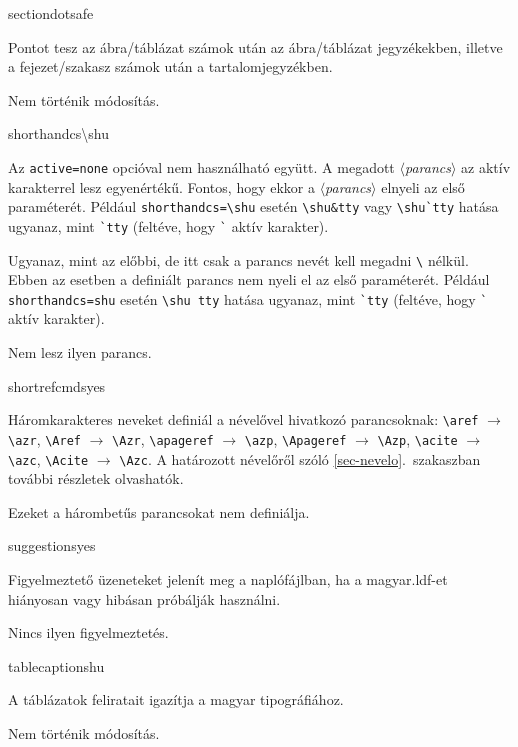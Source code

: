 \documentclass[12pt]{article}
\newcommand\param[1]{{\normalfont\slshape$\langle$#1$\rangle$}}
\begin{document}
\begin{description}
\begin{hunopt}{sectiondot}{safe}
\item[safe]
Pontot tesz az ábra/táblázat számok után az ábra/táblázat jegyzékekben, illetve a fejezet/szakasz számok után a tartalomjegyzékben.
\item[none]
Nem történik módosítás.
\end{hunopt}

\begin{hunopt}{shorthandcs}{\textbackslash shu}
\item[\param{parancs}]
Az \texttt{active=none} opcióval nem használható együtt.
A megadott \param{parancs} az aktív karakterrel lesz egyenértékű.
Fontos, hogy ekkor a \param{parancs} elnyeli az első paraméterét.
Például \verb|shorthandcs=\shu| esetén \verb|\shu&tty| vagy \verb|\shu`tty| hatása ugyanaz, mint \verb|`tty| (feltéve, hogy \verb|`| aktív karakter).
\item[\param{parancsnév}]
Ugyanaz, mint az előbbi, de itt csak a parancs nevét kell megadni \verb|\| nélkül.
Ebben az esetben a definiált parancs nem nyeli el az első paraméterét.
Például \verb|shorthandcs=shu| esetén \verb|\shu tty| hatása ugyanaz, mint \verb|`tty| (feltéve, hogy \verb|`| aktív karakter).
\item[none]
Nem lesz ilyen parancs.
\end{hunopt}

\begin{hunopt}{shortrefcmds}{yes}
\item[yes]
Háromkarakteres neveket definiál a névelővel hivatkozó parancsoknak: \verb|\aref| $\to$ \verb|\azr|, \verb|\Aref| $\to$ \verb|\Azr|, \verb|\apageref|
$\to$ \verb|\azp|, \verb|\Apageref| $\to$ \verb|\Azp|, \verb|\acite| $\to$ \verb|\azc|, \verb|\Acite| $\to$ \verb|\Azc|.
A határozott névelőről szóló \ref{sec-nevelo}.~szakaszban további részletek olvashatók.
\item[no]
Ezeket a hárombetűs parancsokat nem definiálja.
\end{hunopt}

\begin{hunopt}{suggestions}{yes}
\item[yes]
Figyelmeztető üzeneteket jelenít meg a naplófájlban, ha a \textsf{magyar.ldf}-et hiányosan vagy hibásan próbálják használni.
\item[no]
Nincs ilyen figyelmeztetés.
\end{hunopt}

\begin{hunopt}{tablecaptions}{hu}
\item[hu]
A táblázatok feliratait igazítja a magyar tipográfiához.
\item[unchanged]
Nem történik módosítás.
\end{hunopt}


\end{description}
\end{document}
